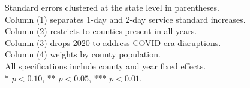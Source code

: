 \begin{table}[htbp]
   \par \raggedright
   Standard errors clustered at the state level in parentheses.\\
   Column (1) separates 1-day and 2-day service standard increases.\\
   Column (2) restricts to counties present in all years.\\
   Column (3) drops 2020 to address COVID-era disruptions.\\
   Column (4) weights by county population.\\
   All specifications include county and year fixed effects.\\
   * $p<0.10$, ** $p<0.05$, *** $p<0.01$.
\end{table}


